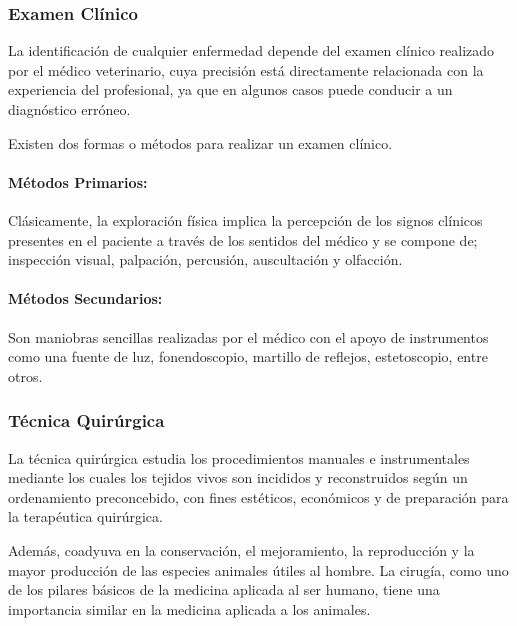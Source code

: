         \subsubsection{Examen Clínico}

            La identificación de cualquier enfermedad depende del examen clínico realizado por el médico veterinario, cuya precisión está directamente relacionada con la experiencia del profesional, ya que en algunos casos puede conducir a un diagnóstico erróneo.

			Existen dos formas o métodos para realizar un examen clínico.  %

            \paragraph{Métodos Primarios:}

            Clásicamente, la exploración física implica la percepción de los signos clínicos presentes en el paciente a través de los sentidos del médico y se compone de; inspección visual, palpación, percusión, auscultación y olfacción.

            \paragraph{Métodos Secundarios:}

            Son maniobras sencillas realizadas por el médico con el apoyo de instrumentos como una fuente de luz, fonendoscopio, martillo de reflejos, estetoscopio, entre otros.

        \subsubsection{Técnica Quirúrgica}

            La técnica quirúrgica estudia los procedimientos manuales e instrumentales mediante los cuales los tejidos vivos son incididos y reconstruidos según un ordenamiento preconcebido, con fines estéticos, económicos y de preparación para la terapéutica quirúrgica.  %

            Además, coadyuva en la conservación, el mejoramiento, la reproducción y la mayor producción de las especies animales útiles al hombre. La cirugía, como uno de los pilares básicos de la medicina aplicada al ser humano, tiene una importancia similar en la medicina aplicada a los animales.  %

